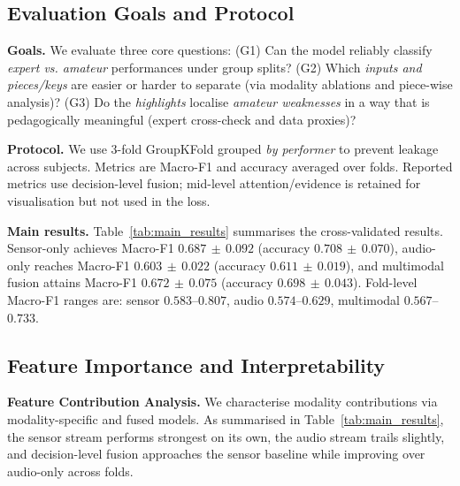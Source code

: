 \documentclass[sigconf,review,anonymous]{acmart}
\begin{document}
\subsection{Evaluation Goals and Protocol}

\textbf{Goals.}
We evaluate three core questions: (G1) Can the model reliably classify \emph{expert vs. amateur} performances under group splits? (G2) Which \emph{inputs and pieces/keys} are easier or harder to separate (via modality ablations and piece-wise analysis)? (G3) Do the \emph{highlights} localise \emph{amateur weaknesses} in a way that is pedagogically meaningful (expert cross-check and data proxies)?

\textbf{Protocol.}
We use 3-fold GroupKFold grouped \emph{by performer} to prevent leakage across subjects. Metrics are Macro-F1 and accuracy averaged over folds. Reported metrics use decision-level fusion; mid-level attention/evidence is retained for visualisation but not used in the loss.

\textbf{Main results.}
Table~\ref{tab:main_results} summarises the cross-validated results. Sensor-only achieves Macro-F1 $0.687\,\pm\,0.092$ (accuracy $0.708\,\pm\,0.070$), audio-only reaches Macro-F1 $0.603\,\pm\,0.022$ (accuracy $0.611\,\pm\,0.019$), and multimodal fusion attains Macro-F1 $0.672\,\pm\,0.075$ (accuracy $0.698\,\pm\,0.043$). Fold-level Macro-F1 ranges are: sensor $0.583$--$0.807$, audio $0.574$--$0.629$, multimodal $0.567$--$0.733$.

\subsection{Feature Importance and Interpretability}

\textbf{Feature Contribution Analysis.}
We characterise modality contributions via modality-specific and fused models. As summarised in Table~\ref{tab:main_results}, the sensor stream performs strongest on its own, the audio stream trails slightly, and decision-level fusion approaches the sensor baseline while improving over audio-only across folds.
\end{document}
